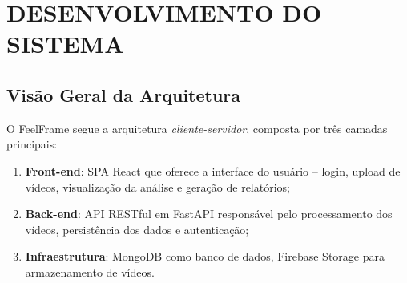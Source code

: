 \documentclass[
	12pt,
	openright,
	oneside,
	a4paper,
	english,
	brazil
	]{abntex2}
\begin{document}
\begin{table}[H]
\centering
\caption{Comparativo entre sistemas de análise emocional de vídeo}
\label{tab:comparativo}
\end{table}

\chapter{DESENVOLVIMENTO DO SISTEMA}
\label{cap:desenvolvimento}

\section{Visão Geral da Arquitetura}

O FeelFrame segue a arquitetura \textit{cliente-servidor}, composta por três camadas principais:

\begin{enumerate}
    \item \textbf{Front-end}: SPA React que oferece a interface do usuário -- login, upload de vídeos, visualização da análise e geração de relatórios;
    \item \textbf{Back-end}: API RESTful em FastAPI responsável pelo processamento dos vídeos, persistência dos dados e autenticação;
    \item \textbf{Infraestrutura}: MongoDB como banco de dados, Firebase Storage para armazenamento de vídeos.
\end{enumerate}
\end{document}
